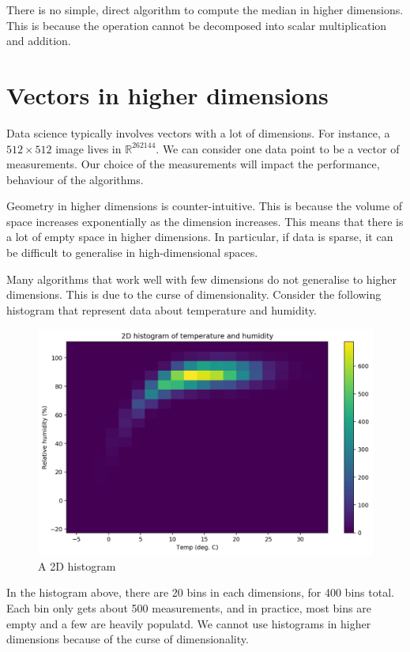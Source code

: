 \documentclass[a4paper, openany]{memoir}
\begin{document}
    There is no simple, direct algorithm to compute the median in higher dimensions. This is because the operation cannot be decomposed into scalar multiplication and addition.
    \newpage

    \section{Vectors in higher dimensions}
    Data science typically involves vectors with a lot of dimensions. For instance, a $512 \times 512$ image lives in $\mathbb{R}^{262 144}$. We can consider one data point to be a vector of measurements. Our choice of the measurements will impact the performance, behaviour of the algorithms.

    Geometry in higher dimensions is counter-intuitive. This is because the volume of space increases exponentially as the dimension increases. This means that there is a lot of empty space in higher dimensions. In particular, if data is sparse, it can be difficult to generalise in high-dimensional spaces. 

    Many algorithms that work well with few dimensions do not generalise to higher dimensions. This is due to the curse of dimensionality. Consider the following histogram that represent data about temperature and humidity.
    \begin{figure}[H]
        \centering
        \includegraphics[scale=0.5]{src/3.5 2DHistogram.png}
        \caption{A 2D histogram}
    \end{figure}
    \noindent In the histogram above, there are 20 bins in each dimensions, for 400 bins total. Each bin only gets about 500 measurements, and in practice, most bins are empty and a few are heavily populatd. We cannot use histograms in higher dimensions because of the curse of dimensionality.
\end{document}
